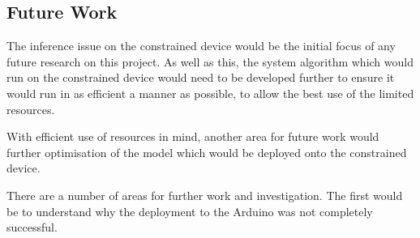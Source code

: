 \documentclass[conference]{IEEEtran}
\begin{document}
\subsection{Future Work}
The inference issue on the constrained device would be the initial focus of any future research on this project. As well as this, the system algorithm which would run on the constrained device would need to be developed further to ensure it would run in as efficient a manner as possible, to allow the best use of the limited resources. 

With efficient use of resources in mind, another area for future work would further optimisation of the model which would be deployed onto the constrained device. 

There are a number of areas for further work and investigation. The first would be to understand why the deployment to the Arduino was not completely successful. 

\end{document}
